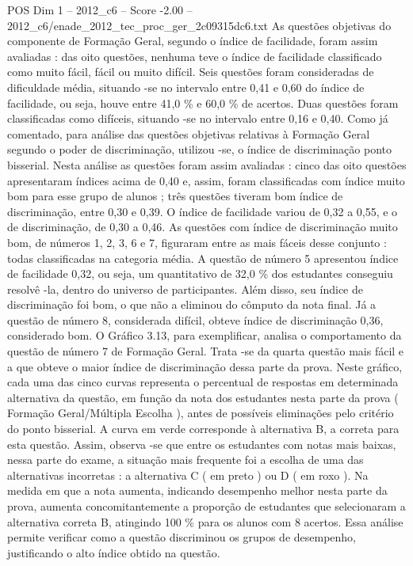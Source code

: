 \begin{textsample}{POS Dim 1 – 2012\_c6 – Score -2.00 – 2012\_c6/enade\_2012\_tec\_proc\_ger\_2c09315dc6.txt}
As questões objetivas do componente de Formação Geral, segundo o índice de facilidade, foram assim avaliadas : das oito questões, nenhuma teve o índice de facilidade classificado como muito fácil, fácil ou muito difícil.
Seis questões foram consideradas de dificuldade média, situando -se no intervalo entre 0,41 e 0,60 do índice de facilidade, ou seja, houve entre 41,0 \% e 60,0 \% de acertos.
Duas questões foram classificadas como difíceis, situando -se no intervalo entre 0,16 e 0,40.
Como já comentado, para análise das questões objetivas relativas à Formação Geral segundo o poder de discriminação, utilizou -se, o índice de discriminação ponto bisserial.
Nesta análise as questões foram assim avaliadas : cinco das oito questões apresentaram índices acima de 0,40 e, assim, foram classificadas com índice muito bom para esse grupo de alunos ; três questões tiveram bom índice de discriminação, entre 0,30 e 0,39.
O índice de facilidade variou de 0,32 a 0,55, e o de discriminação, de 0,30 a 0,46.
As questões com índice de discriminação muito bom, de números 1, 2, 3, 6 e 7, figuraram entre as mais fáceis desse conjunto : todas classificadas na categoria média.
A questão de número 5 apresentou índice de facilidade 0,32, ou seja, um quantitativo de 32,0 \% dos estudantes conseguiu resolvê -la, dentro do universo de participantes.
Além disso, seu índice de discriminação foi bom, o que não a eliminou do cômputo da nota final.
Já a questão de número 8, considerada difícil, obteve índice de discriminação 0,36, considerado bom.
O Gráfico 3.13, para exemplificar, analisa o comportamento da questão de número 7 de Formação Geral.
Trata -se da quarta questão mais fácil e a que obteve o maior índice de discriminação dessa parte da prova.
Neste gráfico, cada uma das cinco curvas representa o percentual de respostas em determinada alternativa da questão, em função da nota dos estudantes nesta parte da prova ( Formação Geral/Múltipla Escolha ), antes de possíveis eliminações pelo critério do ponto bisserial.
A curva em verde corresponde à alternativa B, a correta para esta questão.
Assim, observa -se que entre os estudantes com notas mais baixas, nessa parte do exame, a situação mais frequente foi a escolha de uma das alternativas incorretas : a alternativa C ( em preto ) ou D ( em roxo ).
Na medida em que a nota aumenta, indicando desempenho melhor nesta parte da prova, aumenta concomitantemente a proporção de estudantes que selecionaram a alternativa correta B, atingindo 100 \% para os alunos com 8 acertos.
Essa análise permite verificar como a questão discriminou os grupos de desempenho, justificando o alto índice obtido na questão.

\end{textsample}
